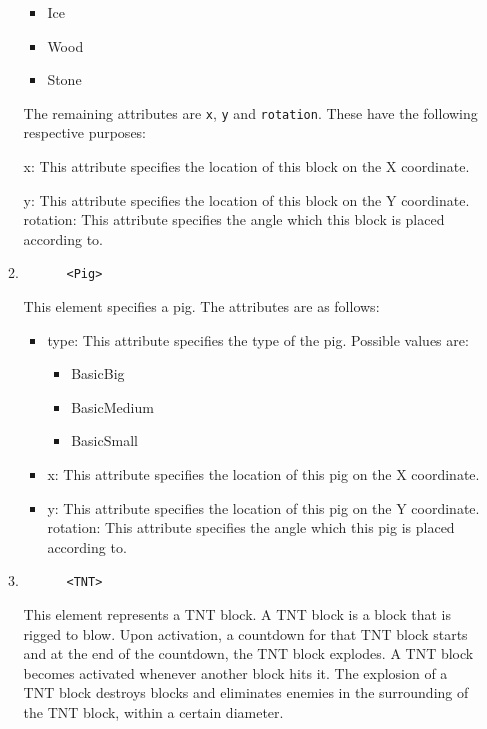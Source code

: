 \documentclass[12pt]{dalthesis}
\begin{document}
\begin{enumerate}
\begin{enumerate}
    \begin{itemize}
      \item Ice
      \item Wood
      \item Stone
    \end{itemize}

    The remaining attributes are \lstinline{x}, \lstinline{y} and \lstinline{rotation}. These have the following respective purposes:

    x: This attribute specifies the location of this block on the X coordinate.

    y: This attribute specifies the location of this block on the Y coordinate.
    rotation: This attribute specifies the angle which this block is placed according to.

    \item

    \begin{lstlisting}
      <Pig>
    \end{lstlisting}

    This element specifies a pig. The attributes are as follows:

    \begin{itemize}
      \item type: This attribute specifies the type of the pig. Possible values are:

      \begin{itemize}
        \item BasicBig
        \item BasicMedium
        \item BasicSmall
      \end{itemize}

      \item x: This attribute specifies the location of this pig on the X coordinate.
      \item y: This attribute specifies the location of this pig on the Y coordinate.
      rotation: This attribute specifies the angle which this pig is placed according to.
    \end{itemize}

    \item

    \begin{lstlisting}
      <TNT>
    \end{lstlisting}

    This element represents a TNT block. A TNT block is a block that is rigged to blow. Upon activation, a countdown for that TNT block starts and at the end of the countdown, the TNT block explodes. A TNT block becomes activated whenever another block hits it. The explosion of a TNT block destroys blocks and eliminates enemies in the surrounding of the TNT block, within a certain diameter.
  \end{enumerate}


\end{enumerate}
\end{document}

